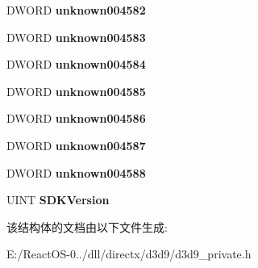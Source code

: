 \begin{DoxyCompactItemize}
D\+W\+O\+RD {\bfseries unknown004582}
\item 
\mbox{\label{struct___d_i_r_e_c_t3_d9___i_n_t_ad74a199377e6567d042fb8efd0741634}} 
D\+W\+O\+RD {\bfseries unknown004583}
\item 
\mbox{\label{struct___d_i_r_e_c_t3_d9___i_n_t_a194cb56bcdf2ec268f292a51c1a1efed}} 
D\+W\+O\+RD {\bfseries unknown004584}
\item 
\mbox{\label{struct___d_i_r_e_c_t3_d9___i_n_t_ae77a6962bf773b09a967607bd6d28d55}} 
D\+W\+O\+RD {\bfseries unknown004585}
\item 
\mbox{\label{struct___d_i_r_e_c_t3_d9___i_n_t_a26aea043e40d8596e2e865e4ac81bac5}} 
D\+W\+O\+RD {\bfseries unknown004586}
\item 
\mbox{\label{struct___d_i_r_e_c_t3_d9___i_n_t_af4dce4f79b171f7c0eb23251f3f44cb1}} 
D\+W\+O\+RD {\bfseries unknown004587}
\item 
\mbox{\label{struct___d_i_r_e_c_t3_d9___i_n_t_a73d19e8b1c5cb015510a06cb16aad21a}} 
D\+W\+O\+RD {\bfseries unknown004588}
\item 
\mbox{\label{struct___d_i_r_e_c_t3_d9___i_n_t_a43796a3864274d677ea3abb3ff2de340}} 
U\+I\+NT {\bfseries S\+D\+K\+Version}
\end{DoxyCompactItemize}


该结构体的文档由以下文件生成\+:\begin{DoxyCompactItemize}
\item 
E\+:/\+React\+O\+S-\/0../dll/directx/d3d9/d3d9\+\_\+private.\+h\end{DoxyCompactItemize}
